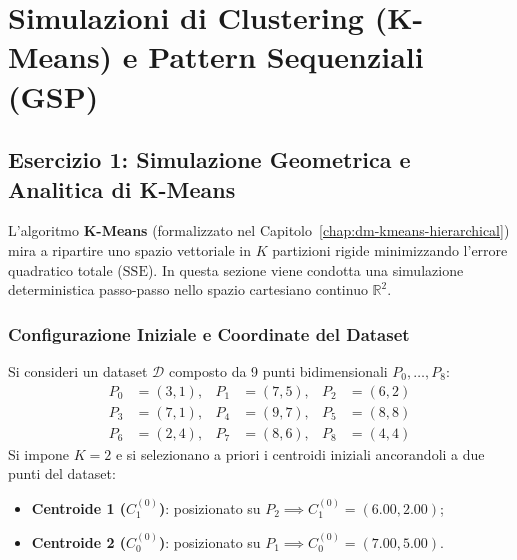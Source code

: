 \FloatBarrier
\section{Simulazioni di Clustering (K-Means) e Pattern Sequenziali (GSP)}
\label{sec:dm-app-kmeans-gsp}
\subsection{Esercizio 1: Simulazione Geometrica e Analitica di K-Means}
\label{sec:dm-kmeans-exercise-1}

L'algoritmo \textbf{K-Means} (formalizzato nel Capitolo~\ref{chap:dm-kmeans-hierarchical}) mira a ripartire uno spazio vettoriale in $K$ partizioni rigide minimizzando l'errore quadratico totale ($\mathrm{SSE}$). In questa sezione viene condotta una simulazione deterministica passo-passo nello spazio cartesiano continuo $\mathbb{R}^2$.

\FloatBarrier
\subsubsection{Configurazione Iniziale e Coordinate del Dataset}
Si consideri un dataset $\mathcal{D}$ composto da 9 punti bidimensionali $P_0, \dots, P_8$:
\begin{align}
P_0 &= (3, 1), & P_1 &= (7, 5), & P_2 &= (6, 2) \nonumber \\
P_3 &= (7, 1), & P_4 &= (9, 7), & P_5 &= (8, 8) \nonumber \\
P_6 &= (2, 4), & P_7 &= (8, 6), & P_8 &= (4, 4)
\end{align}
Si impone $K = 2$ e si selezionano a priori i centroidi iniziali ancorandoli a due punti del dataset:
\begin{itemize}
    \item \textbf{Centroide 1 ($C_1^{(0)}$)}: posizionato su $P_2 \implies C_1^{(0)} = (6.00, 2.00)$;
    \item \textbf{Centroide 2 ($C_0^{(0)}$)}: posizionato su $P_1 \implies C_0^{(0)} = (7.00, 5.00)$.
\end{itemize}

\FloatBarrier
